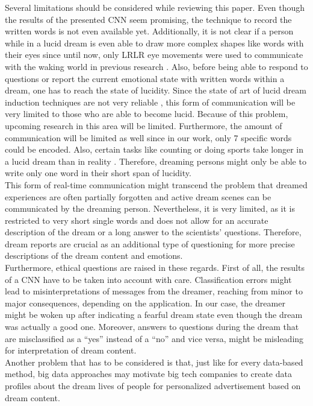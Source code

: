 \documentclass{article}
\begin{document}
Several limitations should be considered while reviewing this paper. Even though the results of the presented CNN seem promising, the technique to record the written words is not even available yet. Additionally, it is not clear if a person while in a lucid dream is even able to draw more complex shapes like words with their eyes since until now, only LRLR eye movements were used to communicate with the waking world in previous research \citep{konkoly2021real}. Also, before being able to respond to questions or report the current emotional state with written words within a dream, one has to reach the state of lucidity. Since the state of art of lucid dream induction techniques are not very reliable \citep[e.g.,][]{saunders2016lucid, stumbrys2012induction}, this form of communication will be very limited to those who are able to become lucid. Because of this problem, upcoming research in this area will be limited. Furthermore, the amount of communication will be limited as well since in our work, only 7 specific words could be encoded. Also, certain tasks like counting or doing sports take longer in a lucid dream than in reality \citep{erlacher2014time}. Therefore, dreaming persons might only be able to write only one word in their short span of lucidity.
\\
This form of real-time communication might transcend the problem that dreamed experiences are often partially forgotten and active dream scenes can be communicated by the dreaming person. Nevertheless, it is very limited, as it is restricted to very short single words and does not allow for an accurate description of the dream or a long answer to the scientists' questions. Therefore, dream reports are crucial as an additional type of questioning for more precise descriptions of the dream content and emotions. 
\\
Furthermore, ethical questions are raised in these regards. First of all, the results of a CNN have to be taken into account with care. Classification errors might lead to misinterpretations of messages from the dreamer, reaching from minor to major consequences, depending on the application. In our case, the dreamer might be woken up after indicating a fearful dream state even though the dream was actually a good one. Moreover, answers to questions during the dream that are misclassified as a “yes” instead of a “no” and vice versa, might be misleading for interpretation of dream content.
\\
Another problem that has to be considered is that, just like for every data-based method, big data approaches may motivate big tech companies to create data profiles about the dream lives of people for personalized advertisement based on dream content.
\end{document}
